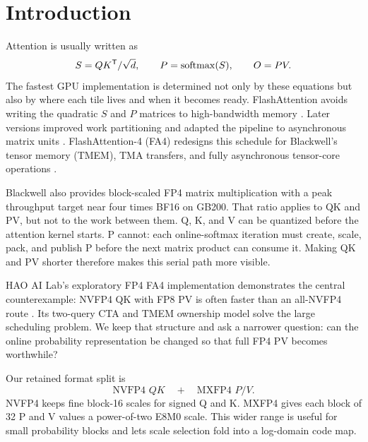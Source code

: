 \section{Introduction}

Attention is usually written as
\begin{equation}
  S=QK^\mathsf{T}/\sqrt d,\qquad
  P=\operatorname{softmax}(S),\qquad
  O=PV.
  \label{eq:attention-intro}
\end{equation}
The fastest GPU implementation is determined not only by these equations but
also by where each tile lives and when it becomes ready. FlashAttention avoids
writing the quadratic $S$ and $P$ matrices to high-bandwidth memory
\cite{dao2022flashattention}. Later versions improved work partitioning and
adapted the pipeline to asynchronous matrix units
\cite{dao2023flashattention2,shah2024flashattention3}. FlashAttention-4 (FA4)
redesigns this schedule for Blackwell's tensor memory (TMEM), TMA transfers,
and fully asynchronous tensor-core operations
\cite{zadouri2026flashattention4}.

Blackwell also provides block-scaled FP4 matrix multiplication with a peak
throughput target near four times BF16 on GB200. That ratio applies to QK and
PV, but not to the work between them. Q, K, and V can be quantized before the
attention kernel starts. P cannot: each online-softmax iteration must create,
scale, pack, and publish P before the next matrix product can consume it.
Making QK and PV shorter therefore makes this serial path more visible.

HAO AI Lab's exploratory FP4 FA4 implementation demonstrates the central
counterexample: NVFP4 QK with FP8 PV is often faster than an all-NVFP4 route
\cite{hao2026fp4flashattention,zhang2026attnqat}. Its two-query CTA and TMEM
ownership model solve the large scheduling problem. We keep that structure
and ask a narrower question: can the online probability representation be
changed so that full FP4 PV becomes worthwhile?

Our retained format split is
\begin{equation}
  \boxed{\text{NVFP4 }QK \quad + \quad \text{MXFP4 }P/V.}
  \label{eq:retained-format}
\end{equation}
NVFP4 keeps fine block-16 scales for signed Q and K. MXFP4 gives each block of
32 P and V values a power-of-two E8M0 scale. This wider range is useful for
small probability blocks and lets scale selection fold into a log-domain code
map.

